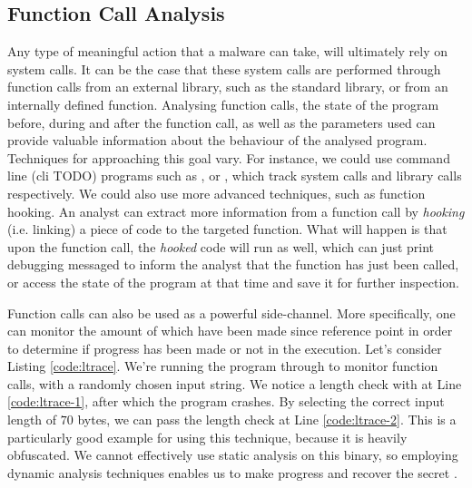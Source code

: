 \subsection{Function Call Analysis}


Any type of meaningful action that a malware can take, will ultimately rely on system calls. It can be the case that these system calls are performed through function calls from an external library, such as the standard  library, or from an internally defined function. Analysing function calls, the state of the program before, during and after the function call, as well as the parameters used can provide valuable information about the behaviour of the analysed program. Techniques for approaching this goal vary. For instance, we could use command line (cli TODO) programs such as , or , which track system calls and library calls respectively. We could also use more advanced techniques, such as function hooking. An analyst can extract more information from a function call by \emph{hooking} (i.e. linking) a piece of code to the targeted function. What will happen is that upon the function call, the \emph{hooked} code will run as well, which can just print debugging messaged to inform the analyst that the function has just been called, or access the state of the program at that time and save it for further inspection. \cite{da_survey_2019}

Function calls can also be used as a powerful side-channel. More specifically, one can monitor the amount of  which have been made since reference point in order to determine if progress has been made or not in the execution. Let's consider Listing \ref{code:ltrace}. We're running the  program through  to monitor function calls, with a randomly chosen input string. We notice a length check with  at Line \ref{code:ltrace-1}, after which the program crashes. By selecting the correct input length of $70$ bytes, we can pass the length check at Line \ref{code:ltrace-2}. This  is a particularly good example for using this technique, because it is heavily obfuscated. We cannot effectively use static analysis on this binary, so employing dynamic analysis techniques enables us to make progress and recover the secret \cite{crusu_relabs}.


